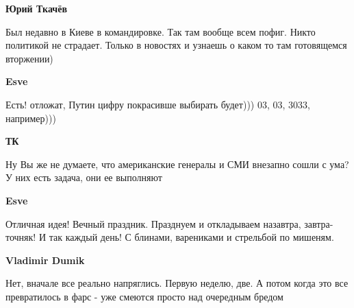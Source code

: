 \begin{itemize}
\textbf{Юрий Ткачёв}

Был недавно в Киеве в командировке. Так там вообще всем пофиг. Никто политикой
не страдает. Только в новостях и узнаешь о каком то там готовящемся вторжении)

\textbf{Esve}

Есть! отложат, Путин цифру покрасивше выбирать будет))) 03, 03, 3033,
например)))

\textbf{ТК}

Ну Вы же не думаете, что американские генералы и СМИ внезапно сошли с ума? У
них есть задача, они ее выполняют

\textbf{Esve}

Отличная идея! Вечный праздник. Празднуем и  откладываем назавтра,
завтра-точняк! И так каждый день! С блинами, варениками и стрельбой по мишеням.

\textbf{Vladimir Dumik}

Нет, вначале все реально напряглись. Первую неделю, две. А потом когда это все
превратилось в фарс - уже смеются просто над очередным бредом

\end{itemize} %
